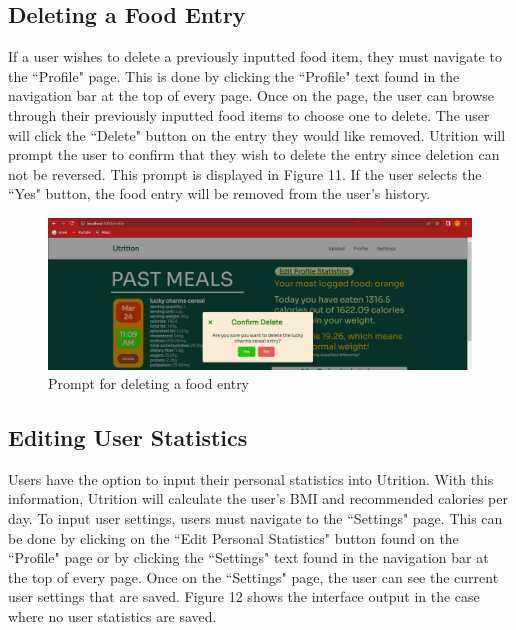 \documentclass{article}
\begin{document}
\subsection{Deleting a Food Entry}
If a user wishes to delete a previously inputted food item, they must navigate to the ``Profile" page. This is done by clicking the ``Profile" text found in the navigation bar at the top of every page. Once on the page, the user can browse through their previously inputted food items to choose one to delete. The user will click the ``Delete" button on the entry they would like removed. Utrition will prompt the user to confirm that they wish to delete the entry since deletion can not be reversed. This prompt is displayed in Figure 11. If the user selects the ``Yes" button, the food entry will be removed from the user's history.

\begin{figure}[H]
	\centering
	\includegraphics[scale=0.30]{deleteitem.png}
	\caption{Prompt for deleting a food entry}
\end{figure}

\subsection{Editing User Statistics}
Users have the option to input their personal statistics into Utrition. With this information, Utrition will calculate the user's BMI and recommended calories per day. To input user settings, users must navigate to the ``Settings" page. This can be done by clicking on the ``Edit Personal Statistics" button found on the ``Profile" page or by clicking the ``Settings" text found in the navigation bar at the top of every page. Once on the ``Settings" page, the user can see the current user settings that are saved. Figure 12 shows the interface output in the case where no user statistics are saved.
\end{document}
